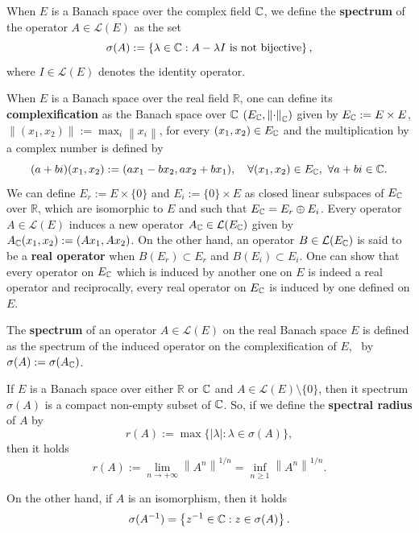 \documentclass{article}
\newcommand{\abs}[1]{\left\lvert{#1}\right\rvert}
\newcommand{\norm}[1]{\left\|{#1}\right\|}
\newcommand{\mc}{\mathcal} \newcommand{\ms}{\mathscr}
\newcommand{\R}{\mathbb{R}}\newcommand{\N}{\mathbb{N}}
\begin{document}
When $E$ is a Banach space over the complex field $\mathbb{C}$, we define the \textbf{spectrum} of the operator $A\in\mc{L}(E)$ as the set
\begin{displaymath}
  \sigma(A):=\left\{\lambda\in\mathbb{C} : A-\lambda I\ \text{is not bijective}\right\},
\end{displaymath}
where $I\in\mc{L}(E)$ denotes the identity operator.

When $E$ is a Banach space over the real field $\R$, one can define its \textbf{complexification} as the Banach space over $\mathbb{C}$ $(E_{\C},\norm{\cdot}_{\C})$ given by $E_{\mathbb{C}}:=E\times E$, $\norm{(x_{1},x_{2})}:=\max_{i}\norm{x_{i}}$, for every $(x_{1},x_{2})\in E_{\mathbb{C}}$ and the multiplication by a complex number is defined by
\begin{displaymath}
  (a+bi) (x_{1},x_{2}):=(ax_{1}-bx_{2},ax_{2}+bx_{1}), \quad\forall (x_{1},x_{2})\in E_{\mathbb{C}},\ \forall a+bi\in\mathbb{C}.
\end{displaymath}
We can define $E_{r}:=E\times\{0\}$ and $E_{i}:=\{0\}\times E$ as closed linear subspaces of $E_{\mathbb{C}}$ over $\R$, which are isomorphic to $E$ and such that $E_{\mathbb{C}}=E_{r}\oplus E_{i}$. Every operator $A\in\mc{L}(E)$ induces a new operator $A_{\C}\in\mc{L}(E_{\C})$ given by $A_{\mathbb{C}}(x_{1},x_{2}):=(Ax_{1},Ax_{2})$. On the other hand, an operator $B\in\mc{L}(E_{\C})$ is said to be a \textbf{real operator} when $B(E_{r})\subset E_{r}$ and $B(E_{i})\subset E_{i}$. One can show that every operator on $E_{\mathbb{C}}$ which is induced by another one on $E$ is indeed a real operator and reciprocally, every real operator on $E_{\mathbb{C}}$ is induced by one defined on $E$.

The \textbf{spectrum} of an operator $A\in\mc{L}(E)$ on the real Banach space $E$ is defined as the spectrum of the induced operator on the complexification of $E$, \ie~by $\sigma(A):=\sigma(A_{\mathbb{C}})$.

\begin{theorem}\label{thm:spectrum-spectral-radius}
  If $E$ is a Banach space over either $\R$ or $\mathbb{C}$ and $A\in\mc{L}(E)\setminus\{0\}$, then it spectrum $\sigma(A)$ is a compact non-empty subset of $\mathbb{C}$. So, if we define the \textbf{spectral radius} of $A$ by
  \begin{displaymath}
    r(A):=\max\{\abs{\lambda} : \lambda\in\sigma(A)\},
  \end{displaymath}
  then it holds
  \begin{equation}\label{eq:formula-spectral-radius}
    r(A):=\lim_{n\to+\infty}\norm{A^{n}}^{1/n} = \inf_{n\geq 1}\norm{A^{n}}^{1/n}.
  \end{equation}

  On the other hand, if $A$ is an isomorphism, then it holds
  \begin{equation}\label{eq:spectrum-inverse}
    \sigma(A^{-1})=\left\{z^{-1}\in\mathbb{C} : z\in\sigma(A)\right\}.
  \end{equation}
\end{theorem}
\end{document}
